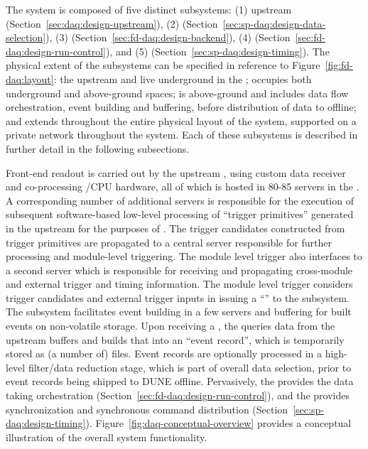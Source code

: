 The   system is composed of five distinct subsystems:
%
(1) upstream  (Section~\ref{sec:daq:design-upstream}),
%
(2)  (Section~\ref{sec:sp-daq:design-data-selection}),
%
(3)  (Section~\ref{sec:fd-daq:design-backend}), 
%
(4)  (Section~\ref{sec:fd-daq:design-run-control}), and
%
(5)  (Section~\ref{sec:sp-daq:design-timing}).
%
The physical extent of the subsystems
can be specified in reference to Figure~\ref{fig:fd-daq:layout}: the
upstream  and   live underground in the ;  occupies
both underground and above-ground spaces;  is above-ground
and includes data flow orchestration, event building and buffering, before distribution of data
to offline; and  extends throughout the entire physical layout of the
system, supported on a private network throughout the  system. Each of these subsystems is described in further
detail in the following subsections. 

Front-end readout is carried out by the upstream , using custom data receiver and
co-processing /CPU hardware, all of which is hosted in 80-85 servers in the . A
corresponding number of additional servers is responsible for the execution
of subsequent software-based low-level processing of ``trigger
primitives''
generated in the upstream  for the purposes of . The trigger candidates constructed from trigger primitives are propagated to a central server responsible
for further processing and module-level triggering. The module level
trigger also
interfaces to a second server which is responsible for receiving and
propagating cross-module and external trigger and timing
information. The module level trigger considers trigger candidates and
external trigger inputs in issuing a ``'' to the 
subsystem. The  subsystem 
facilitates event building in a few servers and buffering for built
events on non-volatile storage. Upon receiving a , the 
 queries
data from the upstream  buffers and builds that into an ``event
record'', which is temporarily stored as (a number of) files. Event records are optionally processed in a high-level
filter/data reduction stage, which is part of overall data selection,
 prior to event records being shipped to DUNE offline. Pervasively,
 the   provides the data taking orchestration
 (Section~\ref{sec:fd-daq:design-run-control}), and the
  provides synchronization and synchronous command distribution
 (Section~\ref{sec:sp-daq:design-timing}). Figure~\ref{fig:daq-conceptual-overview}
 provides a conceptual illustration of the overall  system
 functionality.%

